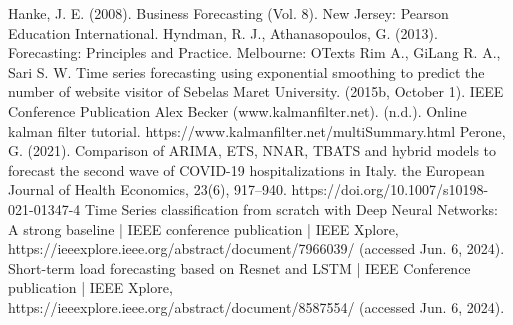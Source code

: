 \documentclass[conference]{IEEEtran}
\begin{document}
\begin{thebibliography}{00}
 Hanke, J. E. (2008). Business Forecasting (Vol. 8). New Jersey:
Pearson Education International.
 Hyndman, R. J., Athanasopoulos, G. (2013). Forecasting:
Principles and Practice. Melbourne: OTexts
 Rim A., GiLang R. A., Sari S. W. Time series forecasting using exponential smoothing to predict the number of website visitor of Sebelas Maret University. (2015b, October 1). IEEE Conference Publication
 Alex Becker (www.kalmanfilter.net). (n.d.). Online kalman filter tutorial. https://www.kalmanfilter.net/multiSummary.html
Perone, G. (2021). Comparison of ARIMA, ETS, NNAR, TBATS and hybrid models to forecast the second wave of COVID-19 hospitalizations in Italy. the European Journal of Health Economics, 23(6), 917–940. https://doi.org/10.1007/s10198-021-01347-4
Time Series classification from scratch with Deep Neural Networks: A strong baseline | IEEE conference publication | IEEE Xplore, https://ieeexplore.ieee.org/abstract/document/7966039/ (accessed Jun. 6, 2024). 
Short-term load forecasting based on Resnet and LSTM | IEEE Conference publication | IEEE Xplore, https://ieeexplore.ieee.org/abstract/document/8587554/ (accessed Jun. 6, 2024). 
\end{thebibliography}
\end{document}
